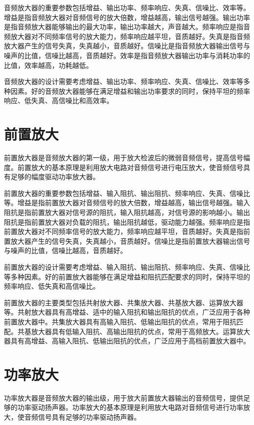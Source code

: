 \documentclass[12pt,UTF8]{ctexbook}
\begin{document}
音频放大器的重要参数包括增益、输出功率、频率响应、失真、信噪比、效率等。增益是指音频放大器对音频信号的放大倍数，增益越高，输出信号越强。输出功率是指音频放大器能够输出的最大功率，输出功率越大，声音越大。频率响应是指音频放大器对不同频率信号的放大能力，频率响应越平坦，音质越好。失真是指音频放大器产生的信号失真，失真越小，音质越好。信噪比是指音频放大器输出信号与噪声的比值，信噪比越高，音质越好。效率是指音频放大器输出功率与消耗功率的比值，效率越高，功耗越低。

音频放大器的设计需要考虑增益、输出功率、频率响应、失真、信噪比、效率等多种因素。好的音频放大器能够在满足增益和输出功率要求的同时，保持平坦的频率响应、低失真、高信噪比和高效率。

\section{前置放大}

前置放大器是音频放大器的第一级，用于放大检波后的微弱音频信号，提高信号幅度。前置放大的基本原理是利用放大电路对音频信号进行电压放大，使音频信号具有足够的幅度驱动功率放大器。

前置放大器的重要参数包括增益、输入阻抗、输出阻抗、频率响应、失真、信噪比等。增益是指前置放大器对音频信号的放大倍数，增益越高，输出信号越强。输入阻抗是指前置放大器对信号源的阻抗，输入阻抗越高，对信号源的影响越小。输出阻抗是指前置放大器对负载的阻抗，输出阻抗越低，驱动能力越强。频率响应是指前置放大器对不同频率信号的放大能力，频率响应越平坦，音质越好。失真是指前置放大器产生的信号失真，失真越小，音质越好。信噪比是指前置放大器输出信号与噪声的比值，信噪比越高，音质越好。

前置放大器的设计需要考虑增益、输入阻抗、输出阻抗、频率响应、失真、信噪比等多种因素。好的前置放大器能够在满足增益和阻抗匹配要求的同时，保持平坦的频率响应、低失真和高信噪比。

前置放大器的主要类型包括共射放大器、共集放大器、共基放大器、运算放大器等。共射放大器具有高增益、适中的输入阻抗和输出阻抗的优点，广泛应用于各种前置放大器中。共集放大器具有高输入阻抗、低输出阻抗的优点，常用于阻抗匹配。共基放大器具有低输入阻抗、高输出阻抗的优点，常用于高频放大。运算放大器具有高增益、高输入阻抗、低输出阻抗的优点，广泛应用于高档前置放大器中。

\section{功率放大}

功率放大器是音频放大器的输出级，用于放大前置放大器输出的音频信号，提供足够的功率驱动扬声器。功率放大的基本原理是利用放大电路对音频信号进行功率放大，使音频信号具有足够的功率驱动扬声器。
\end{document}
